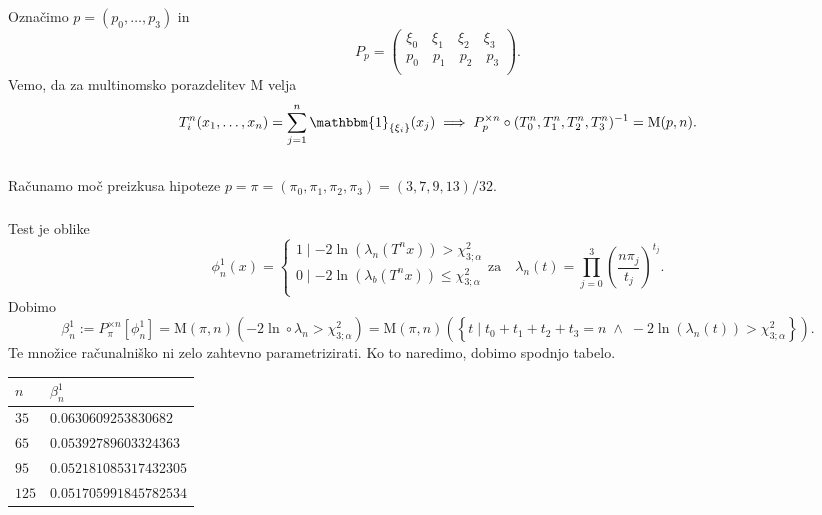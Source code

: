 \documentclass[ letterpaper, titlepage, fleqn]{article}
\newcommand{\ind}{\mathbbm{1}}
\begin{document}
\section{}
Označimo $p = (p_0, \dots, p_3)$ in
$$
P_p = \left(
\begin{array}{ll}
\xi_0 \quad \xi_1 \quad \xi_2 \quad \xi_3 \\
p_0 \quad p_1 \quad p_2 \quad p_3 \\
\end{array}
\right).
$$
Vemo, da za multinomsko porazdelitev M velja
$$T^n_i(x_1, \dots, x_n) = \sum_{j=1}^n \ind_{\{\xi_i\}}(x_j) \implies P_p^{\times n} \circ (T^n_0, T^n_1, T^n_2, T^n_{3})^{-1} = \text{M}(p,n).$$

\subsection{}
Računamo moč preizkusa hipoteze $p = \pi = (\pi_0, \pi_1, \pi_2, \pi_3) =  (3,7,9,13)/32$.
\subsubsection{}
Test je oblike
$$
\phi^1_n(x)= 
\begin{cases}
1 \mid  -2 \ln(\lambda_n(T^nx)) > \chi_{3; \alpha}^2 \\
0 \mid  -2 \ln(\lambda_b(T^nx)) \leq \chi_{3; \alpha}^2 \\
\end{cases} \text{za}\quad
\lambda_n(t) = \prod_{j=0}^3 \left(\frac{n \pi_j}{t_j}\right)^{t_j}.
$$
Dobimo
\begin{equation*}
\beta^1_n := P_\pi^{\times n}[\phi^1_n] = \text{M}(\pi,n)(-2\ln \circ \lambda_n > \chi_{3;\alpha}^2) =
 \text{M}(\pi,n)\left(\left\{t\mid t_0 + t_1 + t_2 + t_3 = n \;\land\; -2\ln(\lambda_n(t)) > \chi_{3;\alpha}^2\right\}\right).
\end{equation*}
Te množice računalniško ni zelo zahtevno parametrizirati. Ko to naredimo, dobimo spodnjo tabelo.
\begin{center}
\begin{tabular}{|l|l| }
\hline
$n$ & $\beta^1_n$ \\
\hline
$35$ & $0.0630609253830682$ \\
$65$ & $0.05392789603324363$ \\
$95$ & $0.052181085317432305$ \\
$125$ & $0.051705991845782534$  \\
\hline
\end{tabular}
\end{center}
\end{document}
